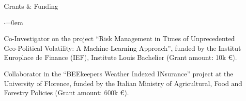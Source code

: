 \documentclass{resume} %
\begin{document}
\begin{rSection}{Grants \& Funding}
\begin{list}{$\cdot$}{\leftmargin=0em}
\item Co-Investigator on the project ``Risk Management in Times of Unprecedented Geo-Political Volatility: A Machine-Learning Approach'', funded by the Institut Europlace de Finance (IEF), Institute Louis Bachelier (Grant amount: 10k \euro{}).
\item Collaborator in the ``BEEkeepers Weather Indexed INsurance'' project at the University of Florence, funded by the Italian Ministry of Agricultural, Food and Forestry Policies (Grant amount: 600k \euro{}).
\end{list}
\end{rSection}
\end{document}
